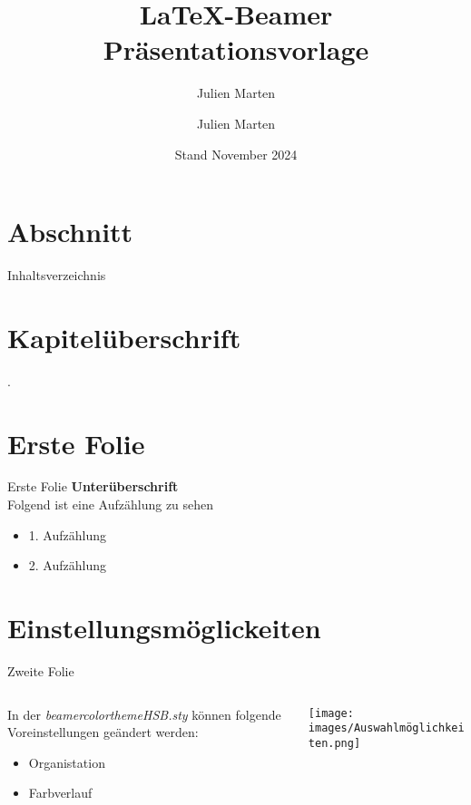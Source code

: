 \documentclass{beamer}
\title{\LaTeX-Beamer Präsentationsvorlage}
\subtitle{Julien Marten}
\author{Julien Marten}
\date{Stand November 2024}
\begin{document}
\begin{frame}[plain]
    \titlepage
\end{frame}


\section{Abschnitt}


\begin{inhaltsverzeichnis}
    \begin{frame}[plain]{Inhaltsverzeichnis}
    \tableofcontents
    \end{frame}
\end{inhaltsverzeichnis}

\section{Kapitelüberschrift}

\begin{kapitel}
    \begin{frame}[plain]{\thesection. \insertsection}
    \end{frame}
\end{kapitel}


\section{Erste Folie}
\begin{frame}[t]{Erste Folie}
    \textbf{Unterüberschrift} \\
    Folgend ist eine Aufzählung zu sehen
    \begin{itemize}
        \item 1. Aufzählung
        \item 2. Aufzählung
    \end{itemize}
\end{frame}

\section{Einstellungsmöglickeiten}
\begin{frame}[t]{Zweite Folie}
    \begin{columns}[t]
        \begin{column}{0.5\textwidth}
        In der \emph{beamercolorthemeHSB.sty} können folgende Voreinstellungen geändert werden:
            \begin{itemize}
                \item Organistation
                \item Farbverlauf
            \end{itemize}
        \end{column}
        \begin{column}{0.4\textwidth}  %
            \begin{center}
             \texttt{[image: images/Auswahlmöglichkeiten.png]}
             \end{center}
        \end{column}
    \end{columns}
\end{frame}
\end{document}
